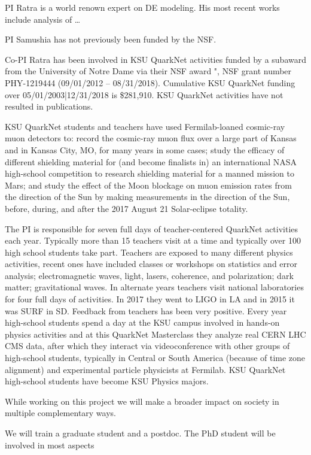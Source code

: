 PI Ratra is a world renown expert on DE modeling. His most recent works include
analysis of \ldots


PI Samushia has not previously been funded by the NSF.

Co-PI Ratra has been involved in  KSU QuarkNet activities funded by a subaward
from the University of Notre Dame via their NSF award \QuarkNet", NSF grant
number PHY-1219444 (09/01/2012 -- 08/31/2018).  Cumulative KSU QuarkNet funding
over 05/01/2003|12/31/2018 is \$281,910. KSU QuarkNet activities have not
resulted in publications. 

KSU QuarkNet students and teachers have used Fermilab-loaned cosmic-ray muon
detectors to: record the cosmic-ray muon flux over a large part of Kansas and
in Kansas City, MO, for many years in some cases; study the efficacy of
different shielding material for (and become finalists in) an international
NASA high-school competition to research shielding material for a manned
mission to Mars; and study the effect of the Moon blockage on muon emission
rates from the direction of the Sun by making measurements in the direction of
the Sun, before, during, and after the 2017 August 21 Solar-eclipse totality.

The PI is responsible for seven full days of teacher-centered QuarkNet
activities each year. Typically more than 15 teachers visit at a time and
typically over 100 high school students take part. Teachers are exposed to many
different physics activities, recent ones have included classes or workshops on
statistics and error analysis; electromagnetic waves, light, lasers, coherence,
and polarization; dark matter; gravitational waves.  In alternate years
teachers visit national laboratories for four full days of activities. In 2017
they went to LIGO in LA and in 2015 it was SURF in SD.  Feedback from teachers
has been very positive. Every year high-school students spend a day at the KSU
campus involved in hands-on physics activities and at this QuarkNet Masterclass
they analyze real CERN LHC CMS data, after which they interact via
videoconference with other groups of high-school students, typically in
Central or South America (because of time zone alignment) and experimental
particle physicists at Fermilab. KSU QuarkNet high-school students have become
KSU Physics majors. 




While working on this project we will make a broader impact on society in
multiple complementary ways.

We will train a graduate student and a postdoc. The PhD student will be
involved in most aspects 


